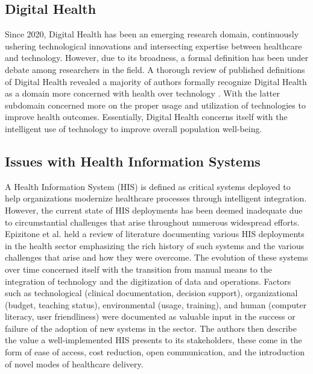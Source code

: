 \documentclass[11pt,a4paper,titlepage]{article}
\begin{document}
	\subsection{Digital Health}
	Since 2020, Digital Health has been an emerging research domain, continuously ushering technological innovations and intersecting expertise between healthcare and technology. However, due to its broadness, a formal definition has been under debate among researchers in the field. A thorough review of published definitions of Digital Health revealed a majority of authors formally recognize Digital Health as a domain more concerned with health  over technology \cite{fatehi_2020_what}. With the latter subdomain concerned more on the proper usage and utilization of technologies to improve health outcomes. Essentially, Digital Health concerns itself with the intelligent use of technology to improve overall population well-being.
	
	\subsection{Issues with Health Information Systems}
	A Health Information System (HIS) is defined as critical systems deployed to help organizations modernize healthcare processes through intelligent integration. However, the current state of HIS deployments has been deemed inadequate due to circumstantial challenges that arise throughout numerous widespread efforts. Epizitone et al. \cite{epizitone_2023_a} held a review of literature documenting various HIS deployments in the health sector emphasizing the rich history of such systems and the various challenges that arise and how they were overcome. The evolution of these systems over time concerned itself with the transition from manual means to the integration of technology and the digitization of data and operations. Factors such as technological (clinical documentation, decision support), organizational (budget, teaching status), environmental (usage, training), and human (computer literacy, user friendliness) were documented as valuable input in the success or failure of the adoption of new systems in the sector. The authors then describe the value a well-implemented HIS presents to its stakeholders, these come in the form of ease of access, cost reduction, open communication, and the introduction of novel modes of healthcare delivery. 
	
\end{document}
